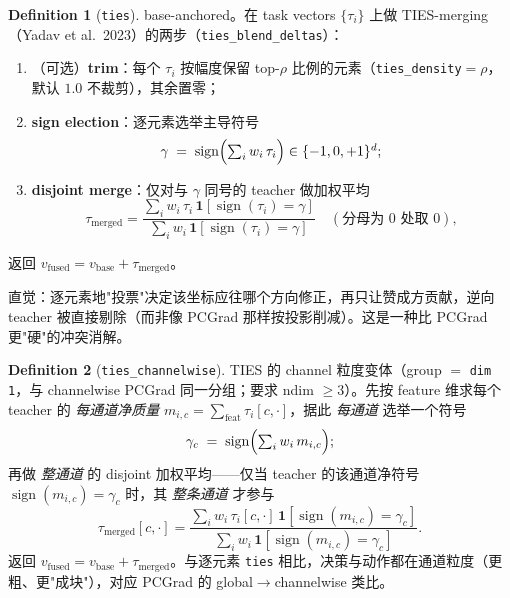 \documentclass[11pt,a4paper]{article}
\newcommand{\vb}{v_{\mathrm{base}}}
\newcommand{\vfused}{v_{\mathrm{fused}}}
\DeclareMathOperator{\sign}{sign}
\theoremstyle{plain}
\theoremstyle{definition}
\newtheorem{definition}{Definition}
\begin{document}
\begin{definition}[\texttt{ties}]
\label{def:ties}
base-anchored。在 task vectors $\{\tau_i\}$ 上做 TIES-merging（Yadav et al.\ 2023）的两步（\texttt{ties\_blend\_deltas}）：
\begin{enumerate}[leftmargin=1.6em]
\item（可选）\textbf{trim}：每个 $\tau_i$ 按幅度保留 top-$\rho$ 比例的元素（\texttt{ties\_density}$=\rho$，默认 $1.0$ 不裁剪），其余置零；
\item \textbf{sign election}：逐元素选举主导符号
\begin{equation}
\gamma \;=\; \sign\Bigl(\textstyle\sum_i w_i\,\tau_i\Bigr)\in\{-1,0,+1\}^d;
\label{eq:ties_sign}
\end{equation}
\item \textbf{disjoint merge}：仅对与 $\gamma$ 同号的 teacher 做加权平均
\begin{equation}
\tau_{\mathrm{merged}}
=\frac{\sum_i w_i\,\tau_i\,\mathbf{1}[\sign(\tau_i)=\gamma]}{\sum_i w_i\,\mathbf{1}[\sign(\tau_i)=\gamma]}
\quad(\text{分母为 }0\text{ 处取 }0),
\label{eq:ties_merge}
\end{equation}
\end{enumerate}
返回 $\vfused=\vb+\tau_{\mathrm{merged}}$。
\end{definition}

直觉：逐元素地"投票"决定该坐标应往哪个方向修正，再只让赞成方贡献，逆向 teacher 被直接剔除（而非像 PCGrad 那样按投影削减）。这是一种比 PCGrad 更"硬"的冲突消解。

\begin{definition}[\texttt{ties\_channelwise}]
\label{def:ties_channelwise}
TIES 的 channel 粒度变体（group $=$ \texttt{dim 1}，与 channelwise PCGrad 同一分组；要求 ndim $\ge 3$）。先按 feature 维求每个 teacher 的 \emph{每通道净质量} $m_{i,c}=\sum_{\text{feat}}\tau_i[c,\cdot]$，据此 \emph{每通道} 选举一个符号
\begin{equation}
\gamma_c \;=\; \sign\Bigl(\textstyle\sum_i w_i\,m_{i,c}\Bigr);
\label{eq:ties_cw_sign}
\end{equation}
再做 \emph{整通道} 的 disjoint 加权平均——仅当 teacher 的该通道净符号 $\sign(m_{i,c})=\gamma_c$ 时，其 \emph{整条通道} 才参与
\begin{equation}
\tau_{\mathrm{merged}}[c,\cdot]
=\frac{\sum_i w_i\,\tau_i[c,\cdot]\,\mathbf{1}[\sign(m_{i,c})=\gamma_c]}{\sum_i w_i\,\mathbf{1}[\sign(m_{i,c})=\gamma_c]}.
\label{eq:ties_cw_merge}
\end{equation}
返回 $\vfused=\vb+\tau_{\mathrm{merged}}$。与逐元素 \texttt{ties} 相比，决策与动作都在通道粒度（更粗、更"成块"），对应 PCGrad 的 global$\to$channelwise 类比。
\end{definition}
\end{document}
